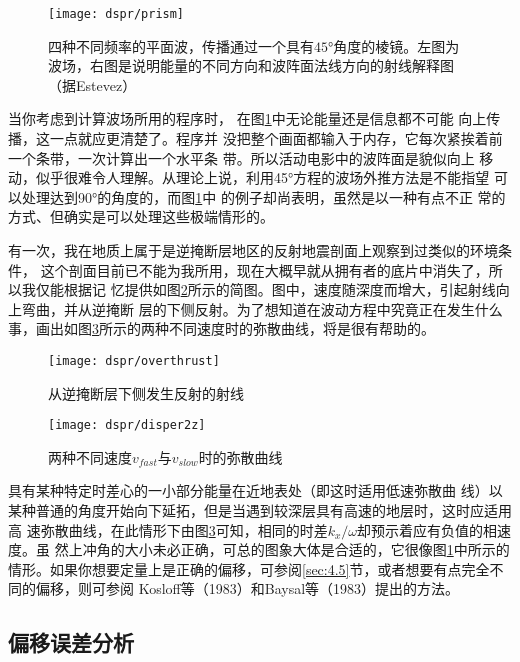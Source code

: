 \begin{figure}[H]
\centering
\texttt{[image: dspr/prism]}
\caption[prism]{四种不同频率的平面波，传播通过一个具有$45$°角度的棱镜。左图为
波场，右图是说明能量的不同方向和波阵面法线方向的射线解释图（据Estevez）}
\label{fig:dspr/prism}
\end{figure}

当你考虑到计算波场所用的程序时，
在图\ref{fig:dspr/prism}中无论能量还是信息都不可能
向上传播，这一点就应更清楚了。程序并
没把整个画面都输入于内存，它每次紧挨着前一个条带，一次计算出一个水平条
带。所以活动电影中的波阵面是貌似向上
移动，似乎很难令人理解。从理论上说，利用45°方程的波场外推方法是不能指望
可以处理达到90°的角度的，而图\ref{fig:dspr/prism}中
的例子却尚表明，虽然是以一种有点不正
常的方式、但确实是可以处理这些极端情形的。

有一次，我在地质上属于是逆掩断层地区的反射地震剖面上观察到过类似的环境条件，
这个剖面目前已不能为我所用，现在大概早就从拥有者的底片中消失了，所以我仅能根据记
忆提供如图\ref{fig:dspr/overthrust}所示的简图。图中，速度随深度而增大，引起射线向上弯曲，并从逆掩断
层的下侧反射。为了想知道在波动方程中究竟正在发生什么事，画出如图\ref{fig:dspr/disper2z}所示的两种不同速度时的弥散曲线，将是很有帮助的。

\begin{figure}[H]
\centering
\texttt{[image: dspr/overthrust]}
\caption[overthrust]{从逆掩断层下侧发生反射的射线}
\label{fig:dspr/overthrust}
\end{figure}

\begin{figure}[H]
\centering
\texttt{[image: dspr/disper2z]}
\caption[disper2z]{两种不同速度$v_{fast}$与$v_{slow}$时的弥散曲线}
\label{fig:dspr/disper2z}
\end{figure}

具有某种特定时差心的一小部分能量在近地表处（即这时适用低速弥散曲
线）以某种普通的角度开始向下延拓，但是当遇到较深层具有高速的地层时，这时应适用高
速弥散曲线，在此情形下由图\ref{fig:dspr/disper2z}可知，相同的时差$k_x/\omega$却预示着应有负值的相速度。虽
然上冲角的大小未必正确，可总的图象大体是合适的，它很像图\ref{fig:dspr/prism}中所示的情形。如果你想要定量上是正确的偏移，可参阅\ref{sec:4.5}节，或者想要有点完全不同的偏移，则可参阅
Kosloff等（1983）和Baysal等（1983）提出的方法。

\subsection{偏移误差分析}
\label{sec:4.2.3}

